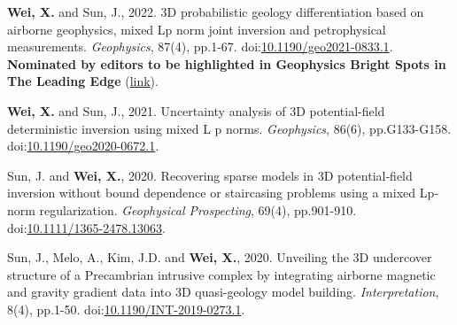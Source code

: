\documentclass[11pt, a4paper]{article}
\newcommand{\LastName}{Wei}
\newcommand{\Initials}{X}
\newcommand{\Wei}{\textbf{\LastName, \Initials.}}  %
\newcommand{\WeiSun}{\textbf{\LastName, \Initials.} and Sun, J.}  %
\newcommand{\DOI}[1]{doi:\href{https://doi.org/#1}{#1}}
\begin{document}
\begin{etaremune}
	\item
	\WeiSun, 2022. 3D probabilistic geology differentiation based on airborne geophysics, mixed Lp norm joint inversion and petrophysical measurements. \emph{Geophysics}, 87(4), pp.1-67.
	\DOI{10.1190/geo2021-0833.1}. \textbf{Nominated by editors to be highlighted in Geophysics Bright Spots in The Leading Edge }(\href{https://library.seg.org/doi/epub/10.1190/tle41100730.1}{link}).
	\item
	\WeiSun, 2021. Uncertainty analysis of 3D potential-field deterministic inversion using mixed L p norms. \emph{Geophysics}, 86(6), pp.G133-G158.
	\DOI{10.1190/geo2020-0672.1}.

	\item
	Sun, J. and \Wei, 2020. Recovering sparse models in 3D potential‐field inversion without bound dependence or staircasing problems using a mixed Lp‐norm regularization. \emph{Geophysical Prospecting}, 69(4), pp.901-910.
	\DOI{10.1111/1365-2478.13063}.

	\item
	Sun, J., Melo, A., Kim, J.D. and \Wei, 2020. Unveiling the 3D undercover structure of a Precambrian intrusive complex by integrating airborne magnetic and gravity gradient data into 3D quasi-geology model building. \emph{Interpretation}, 8(4), pp.1-50.
	\DOI{10.1190/INT-2019-0273.1}.

\end{etaremune}


%
\end{document}
